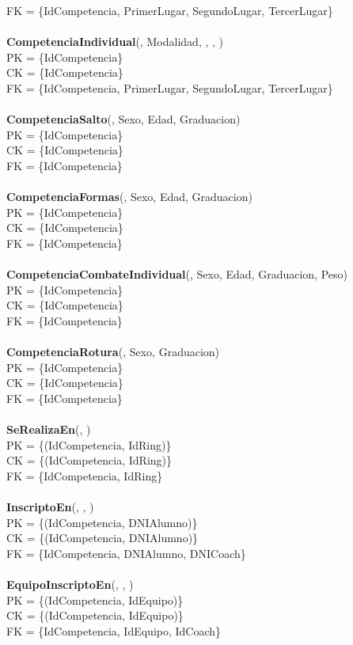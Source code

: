 FK = \{IdCompetencia, PrimerLugar, SegundoLugar, TercerLugar\}\\
\\
\textbf{CompetenciaIndividual}(, Modalidad, , , )\\
PK = \{IdCompetencia\}\\
CK = \{IdCompetencia\}\\
FK = \{IdCompetencia, PrimerLugar, SegundoLugar, TercerLugar\}\\
\\
\textbf{CompetenciaSalto}(, Sexo, Edad, Graduacion)\\
PK = \{IdCompetencia\}\\
CK = \{IdCompetencia\}\\
FK = \{IdCompetencia\}\\
\\
\textbf{CompetenciaFormas}(, Sexo, Edad, Graduacion)\\
PK = \{IdCompetencia\}\\
CK = \{IdCompetencia\}\\
FK = \{IdCompetencia\}\\
\\
\textbf{CompetenciaCombateIndividual}(, Sexo, Edad, Graduacion, Peso)\\
PK = \{IdCompetencia\}\\
CK = \{IdCompetencia\}\\
FK = \{IdCompetencia\}\\
\\
\textbf{CompetenciaRotura}(, Sexo, Graduacion)\\
PK = \{IdCompetencia\}\\
CK = \{IdCompetencia\}\\
FK = \{IdCompetencia\}\\
\\
\textbf{SeRealizaEn}(, )\\
PK = \{(IdCompetencia, IdRing)\}\\
CK = \{(IdCompetencia, IdRing)\}\\
FK = \{IdCompetencia, IdRing\}\\
\\
\textbf{InscriptoEn}(, , )\\
PK = \{(IdCompetencia, DNIAlumno)\}\\
CK = \{(IdCompetencia, DNIAlumno)\}\\
FK = \{IdCompetencia, DNIAlumno, DNICoach\}\\
\\
\textbf{EquipoInscriptoEn}(, , )\\
PK = \{(IdCompetencia, IdEquipo)\}\\
CK = \{(IdCompetencia, IdEquipo)\}\\
FK = \{IdCompetencia, IdEquipo, IdCoach\}\\
\\
